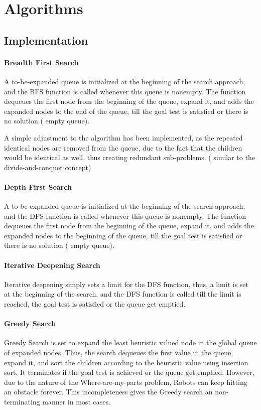 \chapter{Algorithms}
\section{Implementation}
\subsubsection{Breadth First Search}

A to-be-expanded queue is initialized at the beginning of the search approach, and the BFS function is called whenever this queue is nonempty. The function dequeues the first node from the beginning of the queue, expand it, and adds the expanded nodes to the end of the queue, till the goal test is satisfied or there is no solution ( empty queue).

A simple adjustment to the algorithm has been implemented, as the repeated identical nodes are removed from the queue, due to the fact that the children would be identical as well, thus creating redundant sub-problems. ( similar to the divide-and-conquer concept)

\subsubsection{Depth First Search}

A to-be-expanded queue is initialized at the beginning of the search approach, and the DFS function is called whenever this queue is nonempty. The function dequeues the first node from the beginning of the queue, expand it, and adds the expanded nodes to the beginning of the queue, till the goal test is satisfied or there is no solution ( empty queue). 


\subsubsection{Iterative Deepening Search}

Iterative deepening simply sets a limit for the DFS function, thus, a limit is set at the beginning of the search, and the DFS function is called till the limit is reached, the goal test is satisfied or the queue get emptied.

\subsubsection{Greedy Search}
Greedy Search is set to expand the least heuristic valued node in the global queue of expanded nodes. Thus, the search dequeues the first value in the queue, expand it, and sort the children according to the heuristic value using insertion sort. It terminates if the goal test is achieved or the queue get emptied. However, due to the nature of the Where-are-my-parts problem, Robots can keep hitting an obstacle forever. This incompleteness gives the Greedy search an non-terminating manner in most cases.

